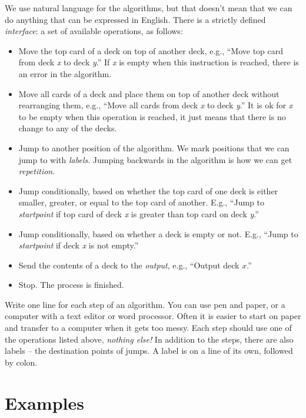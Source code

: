 \documentclass[a4paper,twoside]{tufte-handout}
\begin{document}
We use natural language for the algorithms, but that doesn't mean that
we can do anything that can be expressed in English. There is a
strictly defined \emph{interface}: a set of available operations, as
follows:
\begin{itemize}
\item Move the top card of a deck on top of another deck, e.g., ``Move
  top card from deck \emph{x} to deck \emph{y}.'' If \emph{x} is empty
  when this instruction is reached, there is an error in
  the algorithm.
\item Move all cards of a deck and place them on top of another deck
  without rearranging them, e.g., ``Move all cards from deck \emph{x}
  to deck \emph{y}.'' It is ok for \emph{x} to be empty when this
  operation is reached, it just means that there is no change to any
  of the decks.
\item Jump to another position of the algorithm. We mark positions
  that we can jump to with \emph{labels}. Jumping backwards in the
  algorithm is how we can get \emph{repetition}.
\item Jump conditionally, based on whether the top card of one deck is
  either smaller, greater, or equal to the top card of another. E.g.,
  ``Jump to \emph{startpoint} if top card of deck \emph{x} is greater
  than top card on deck \emph{y}.''
\item Jump conditionally, based on whether a deck is empty or not. E.g.,
  ``Jump to \emph{startpoint} if deck \emph{x} is not empty.''
\item Send the contents of a deck to the \emph{output}, e.g., ``Output deck
  $x$.''
\item Stop. The process is finished.
\end{itemize}

Write one line for each step of an algorithm. You can use pen and
paper, or a computer with a text editor or word processor. Often it is
easier to start on paper and transfer to a computer when it gets too
messy. Each step should use one of the operations listed above,
\emph{nothing else!} In addition to the steps, there are also labels
-- the destination points of jumps. A label is on a
line of its own, followed by colon.

\clearpage

\section{Examples}\label{sec-examp}
\end{document}
